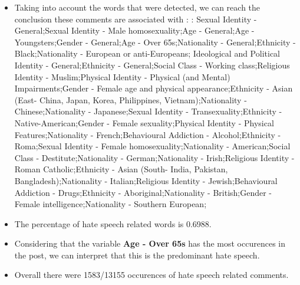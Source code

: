 \documentclass[11pt]{article}
\begin{document}
\begin{itemize}\item Taking into account the words that were detected, we can reach the conclusion these comments are associated with : : Sexual Identity - General;Sexual Identity - Male homosexuality;Age - General;Age - Youngsters;Gender - General;Age - Over 65s;Nationality - General;Ethnicity - Black;Nationality - European or anti-Europeans; Ideological and Political Identity - General;Ethnicity - General;Social Class - Working class;Religious Identity - Muslim;Physical Identity - Physical (and Mental) Impairments;Gender - Female age and physical appearance;Ethnicity - Asian (East- China, Japan, Korea, Philippines, Vietnam);Nationality - Chinese;Nationality - Japanese;Sexual Identity - Transexuality;Ethnicity - Native-American;Gender - Female sexuality;Physical Identity - Physical Features;Nationality - French;Behavioural Addiction - Alcohol;Ethnicity - Roma;Sexual Identity - Female homosexuality;Nationality - American;Social Class - Destitute;Nationality - German;Nationality - Irish;Religious Identity - Roman Catholic;Ethnicity - Asian (South- India, Pakistan, Bangladesh);Nationality - Italian;Religious Identity - Jewish;Behavioural Addiction - Drugs;Ethnicity - Aboriginal;Nationality - British;Gender - Female intelligence;Nationality - Southern European;%

\item The percentage of hate speech related words is 0.6988.

\item Considering that the variable \textbf{Age - Over 65s} has the most occurences in the post, we can interpret that this is the predominant hate speech.

\item Overall there were 1583/13155 occurences of hate speech related comments.\end{itemize}
\end{document}
